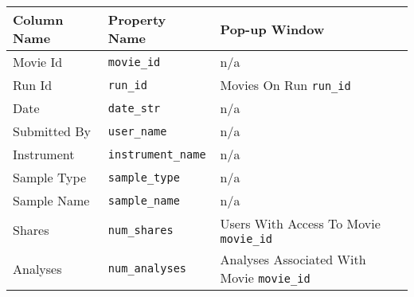 \begin{tabularx}{\textwidth}{l|l|X}
\toprule
 Column Name   & Property Name   & Pop-up Window                           \\
\midrule
 Movie Id      & \texttt{movie\_id}        & n/a                                     \\
 Run Id        & \texttt{run\_id}          & Movies On Run \texttt{run\_id}                    \\
 Date          & \texttt{date\_str}        & n/a                                     \\
 Submitted By  & \texttt{user\_name}       & n/a                                     \\
 Instrument    & \texttt{instrument\_name} & n/a                                     \\
 Sample Type   & \texttt{sample\_type}     & n/a                                     \\
 Sample Name   & \texttt{sample\_name}     & n/a                                     \\
 Shares        & \texttt{num\_shares}      & Users With Access To Movie \texttt{movie\_id}     \\
 Analyses      & \texttt{num\_analyses}    & Analyses Associated With Movie \texttt{movie\_id} \\
\bottomrule
\end{tabularx}
